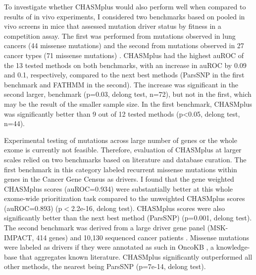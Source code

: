 To investigate whether CHASMplus would also perform well when compared to results of in vivo experiments, I considered two benchmarks based on pooled in vivo screens in mice that assessed mutation driver status by fitness in a competition assay.  The first was performed from mutations observed in lung cancers (44 missense mutations) \cite{RN141} and the second from mutations observed in 27 cancer types (71 missense mutations) \cite{RN143}. CHASMplus had the highest auROC of the 13 tested methods on both benchmarks, with an increase in auROC by 0.09 and 0.1, respectively, compared to the next best methods (ParsSNP in the first benchmark and FATHMM in the second). The increase was significant in the second larger, benchmark (p=0.03, delong test, n=72), but not in the first, which may be the result of the smaller sample size.  In the first benchmark, CHASMplus was significantly better than 9 out of 12 tested methods (p<0.05, delong test, n=44).

Experimental testing of mutations across large number of genes or the whole exome is currently not feasible. Therefore, evaluation of CHASMplus at larger scales relied on two benchmarks based on literature and database curation. The first benchmark in this category labeled recurrent missense mutations within genes in the Cancer Gene Census \cite{RN97} as drivers. I found that the gene weighted CHASMplus scores (auROC=0.934) were substantially better at this whole exome-wide prioritization task compared to the unweighted CHASMplus scores (auROC=0.893) (p$<$2.2e-16, delong test). CHASMplus scores were also significantly better than the next best method (ParsSNP) (p=0.001, delong test). The second benchmark was derived from a large driver gene panel (MSK-IMPACT, 414 genes) and 10,130 sequenced cancer patients \cite{RN145}.  Missense mutations were labeled as drivers if they were annotated as such in OncoKB \cite{RN144}, a knowledge-base that aggregates known literature. CHASMplus significantly outperformed all other methods, the nearest being ParsSNP (p=7e-14, delong test). 

